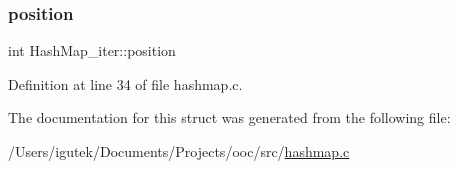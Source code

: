 \subsubsection{\texorpdfstring{position}{position}}
{\footnotesize\ttfamily int Hash\+Map\+\_\+iter\+::position}



Definition at line 34 of file hashmap.\+c.



The documentation for this struct was generated from the following file\+:\begin{DoxyCompactItemize}
\item 
/\+Users/igutek/\+Documents/\+Projects/ooc/src/\mbox{\hyperlink{hashmap_8c}{hashmap.\+c}}\end{DoxyCompactItemize}
